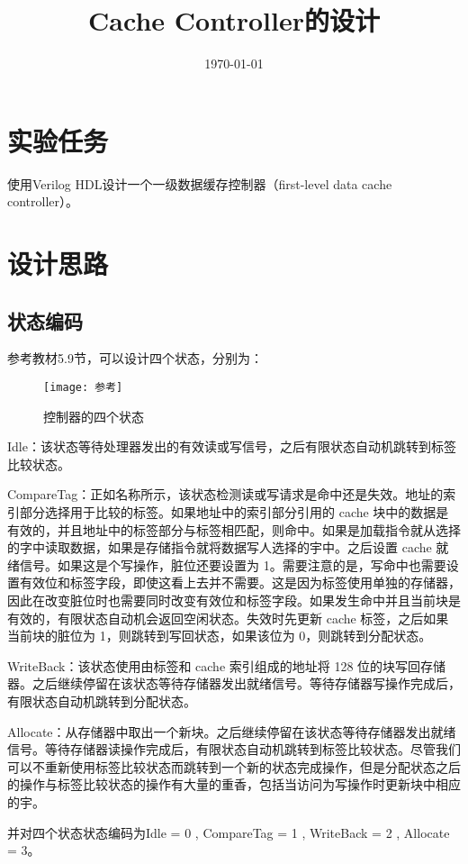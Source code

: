 \documentclass{../source/Experiment}
\title{Cache Controller的设计}
\date{\today}
\begin{document}
    \makecover
    \makeheader
    \section{实验任务}
    使用Verilog HDL设计一个一级数据缓存控制器（first-level  data  cache  controller）。
    \section{设计思路}
        \subsection{状态编码}
            参考教材5.9节，可以设计四个状态，分别为：
            \begin{figure}[H]
                \centering
                \texttt{[image: 参考]}
                \caption{控制器的四个状态}
            \end{figure}

            Idle：该状态等待处理器发出的有效读或写信号，之后有限状态自动机跳转到标签比较状态。

            CompareTag：正如名称所示，该状态检测读或写请求是命中还是失效。地址的索引部分选择用于比较的标签。如果地址中的索引部分引用的 cache 块中的数据是有效的，并且地址中的标签部分与标签相匹配，则命中。如果是加载指令就从选择的字中读取数据，如果是存储指令就将数据写人选择的宇中。之后设置 cache 就绪信号。如果这是个写操作，脏位还要设置为 1。需要注意的是，写命中也需要设置有效位和标签字段，即使这看上去并不需要。这是因为标签使用单独的存储器，因此在改变脏位时也需要同时改变有效位和标签字段。如果发生命中并且当前块是有效的，有限状态自动机会返回空闲状态。失效时先更新 cache 标签，之后如果当前块的脏位为 1，则跳转到写回状态，如果该位为 0，则跳转到分配状态。

            WriteBack：该状态使用由标签和 cache 索引组成的地址将 128 位的块写回存储器。之后继续停留在该状态等待存储器发出就绪信号。等待存储器写操作完成后，有限状态自动机跳转到分配状态。

            Allocate：从存储器中取出一个新块。之后继续停留在该状态等待存储器发出就绪信号。等待存储器读操作完成后，有限状态自动机跳转到标签比较状态。尽管我们可以不重新使用标签比较状态而跳转到一个新的状态完成操作，但是分配状态之后的操作与标签比较状态的操作有大量的重香，包括当访问为写操作时更新块中相应的宇。

            并对四个状态状态编码为Idle = 0 , CompareTag = 1 , WriteBack = 2 , Allocate = 3。
            
\end{document}
